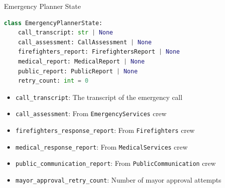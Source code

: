 \begin{frame}[fragile]{Emergency Planner State}
    \begin{lstlisting}[language=Python]
class EmergencyPlannerState:
    call_transcript: str | None
    call_assessment: CallAssessment | None
    firefighters_report: FirefightersReport | None
    medical_report: MedicalReport | None
    public_report: PublicReport | None
    retry_count: int = 0
    \end{lstlisting}
\begin{itemize}
    \item \texttt{call\_transcript}: The transcript of the emergency call
    \item \texttt{call\_assessment}: From \texttt{EmergencyServices} crew
    \item \texttt{firefighters\_response\_report}: From \texttt{Firefighters} crew
    \item \texttt{medical\_response\_report}: From \texttt{MedicalServices} crew
    \item \texttt{public\_communication\_report}: From \texttt{PublicCommunication} crew
    \item \texttt{mayor\_approval\_retry\_count}: Number of mayor approval attempts
\end{itemize}
\end{frame}
